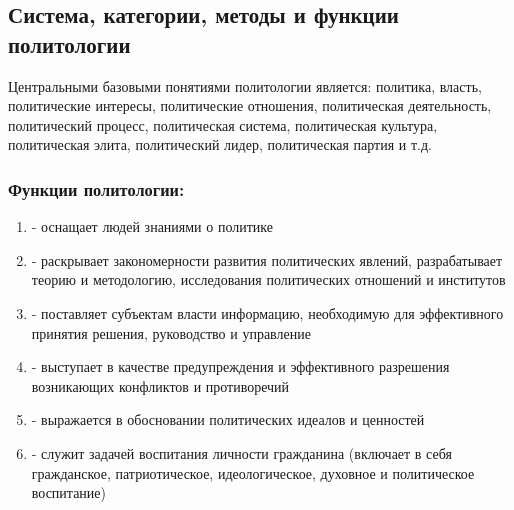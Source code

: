 \subsection{Система, категории, методы и функции политологии}

Центральными базовыми понятиями политологии является: политика, власть, политические
интересы, политические отношения, политическая деятельность, политический процесс,
политическая система, политическая культура, политическая элита, политический лидер,
политическая партия и т.д.

\subsubsection{Функции политологии:}
\begin{enumerate}
      \item {} - оснащает людей
            знаниями о политике
      \item {} - раскрывает закономерности развития
            политических явлений, разрабатывает теорию и методологию, исследования 
            политических отношений и институтов
      \item {} - поставляет субъектам власти информацию,
            необходимую для эффективного принятия решения, руководство и управление
      \item {} - выступает в качестве предупреждения и
            эффективного разрешения возникающих конфликтов и противоречий
      \item {} - выражается в обосновании политических идеалов
            и ценностей
      \item {} - служит задачей воспитания личности гражданина
            (включает в себя гражданское, патриотическое, идеологическое, духовное и 
            политическое воспитание)
\end{enumerate}
